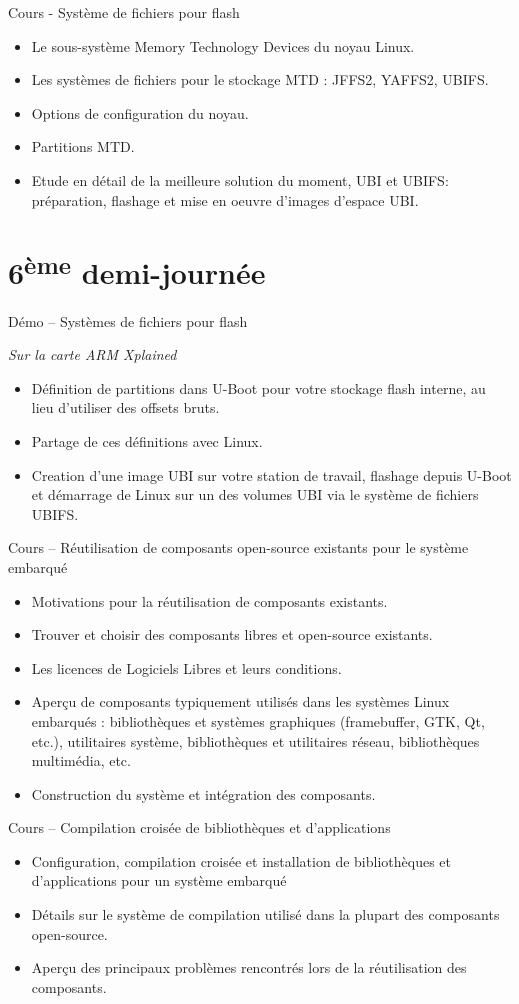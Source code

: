\documentclass[a4paper,12pt,obeyspaces,spaces,hyphens]{article}
\begin{document}
\feagendaonecolumn
{Cours - Système de fichiers pour flash}
{
  \begin{itemize}
  \item Le sous-système Memory Technology Devices du noyau Linux.
  \item Les systèmes de fichiers pour le stockage MTD : JFFS2, YAFFS2, UBIFS.
  \item Options de configuration du noyau.
  \item Partitions MTD.
  \item Etude en détail de la meilleure solution du moment, UBI et UBIFS:
	préparation, flashage et mise en oeuvre d'images d'espace UBI.

  \end{itemize}
}

\section{6\textsuperscript{ème} demi-journée}

\feagendaonecolumn
{Démo – Systèmes de fichiers pour flash}
{
  {\em Sur la carte ARM Xplained}
  \begin{itemize}
  \item Définition de partitions dans U-Boot pour
        votre stockage flash interne, au lieu d'utiliser
        des offsets bruts.
  \item Partage de ces définitions avec Linux.
  \item Creation d'une image UBI sur votre station de travail,
	flashage depuis U-Boot et démarrage de Linux sur un 
        des volumes UBI via le système de fichiers UBIFS.
  \end{itemize}
}

\feagendatwocolumn
{Cours – Réutilisation de composants open-source existants pour le système
embarqué}
{
  \begin{itemize}
  \item Motivations pour la réutilisation de composants existants.
  \item Trouver et choisir des composants libres et open-source existants.
  \item Les licences de Logiciels Libres et leurs conditions.
  \item Aperçu de composants typiquement utilisés dans les systèmes
	Linux embarqués : bibliothèques et systèmes graphiques (framebuffer,
	GTK, Qt, etc.), utilitaires système, bibliothèques et
	utilitaires réseau, bibliothèques multimédia, etc.
  \item Construction du système et intégration des composants.
  \end{itemize}
}
{Cours – Compilation croisée de bibliothèques et d'applications}
{
  \begin{itemize}
  \item Configuration, compilation croisée et installation de bibliothèques
	et d'applications pour un système embarqué
  \item Détails sur le système de compilation utilisé dans la plupart
	des composants open-source.
  \item Aperçu des principaux problèmes rencontrés lors de la
	réutilisation des composants.
  \end{itemize}
}
\end{document}
